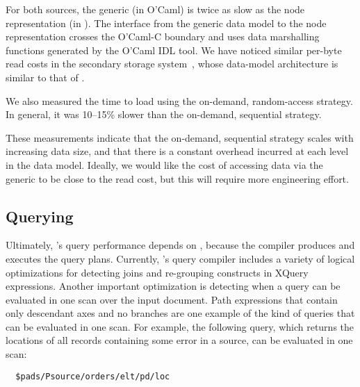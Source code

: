 For both sources, the generic \condm{} (in O'Caml) is twice as slow as
the node representation (in \C{}).  The interface from the generic data
model to the node representation crosses the O'Caml-C boundary and
uses data marshalling functions generated by the O'Caml IDL tool.  We
have noticed similar per-byte read costs in the \Galax{} secondary
storage system~\cite{galax:ximep2004}, whose data-model architecture
is similar to that of \padx{}. 

We also measured the time to load using the on-demand, random-access
strategy.  In general, it was 10--15\% slower than the on-demand,
sequential strategy. 

These measurements indicate that the on-demand, sequential strategy
scales with increasing data size, and that there is a constant
overhead incurred at each level in the data model.  Ideally, we would
like the cost of accessing data via the generic \condm{} to be close
to the \pads{} read cost, but this will require more engineering
effort.


\subsection{Querying}

Ultimately, \padx{}'s query performance depends on \Galax{}, because the
\Galax{} compiler produces and executes the query plans.  Currently,
\Galax{}'s query compiler includes a variety of logical optimizations
for detecting joins and re-grouping constructs in XQuery expressions.
Another important optimization is detecting when a query
can be evaluated in one scan over the input document.  Path
expressions that contain only descendant axes and no branches are one
example of the kind of queries that can be evaluated in one scan.  For
example, the following query, which returns the locations of all
records containing some error in a \dibbler{} source, can be evaluated
in one scan:
\begin{verbatim}
  $pads/Psource/orders/elt/pd/loc
\end{verbatim}

